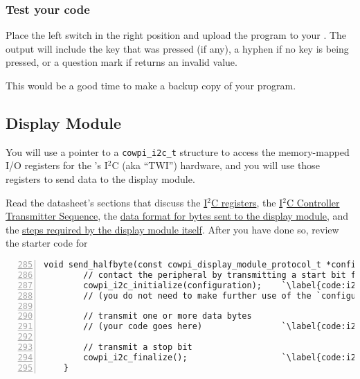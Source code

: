 \subsubsection*{Test your code}

Place the left switch in the right position and upload the program to your \developmentboard.
The output will include the key that was pressed (if any), a hyphen if no key is being pressed, or a question mark if  returns an invalid value.

\vspace{1cm}

This would be a good time to make a backup copy of your program.


\subsection{Display Module} \label{subsec:DisplayModule}

You will use a pointer to a \lstinline{cowpi_i2c_t} structure to access the memory-mapped I/O registers for the \developmentboard's I$^2$C (aka ``TWI'') hardware,
and you will use those registers to send data to the display module.

Read the datasheet's sections that discuss
the \href{https://cow-pi.readthedocs.io/en/latest/microcontroller.html#atmega328ptwistruct}{I$^2$C registers},
the \href{https://cow-pi.readthedocs.io/en/latest/microcontroller.html#controller-transmitter-sequence}{I$^2$C Controller Transmitter Sequence},
the \href{https://cow-pi.readthedocs.io/en/latest/hardware/outputs.html#data-byte-for-lcd1602-display-module}{data format for bytes sent to the display module},
and the \href{https://cow-pi.readthedocs.io/en/latest/hardware/outputs.html#hd44780-driven-lcd-character-display}{steps required by the display module itself}.
After you have done so, review the starter code for

\begin{lstlisting}[numberstyle=\color{gray}, numbers=left, firstnumber=285, basicstyle=\ttfamily\small, escapechar=`]
    void send_halfbyte(const cowpi_display_module_protocol_t *configuration, uint8_t halfbyte, bool is_command) {
        // contact the peripheral by transmitting a start bit followed by the desired peripheral's address
        cowpi_i2c_initialize(configuration);    `\label{code:i2cInitialize}`
        // (you do not need to make further use of the `configuration` argument)

        // transmit one or more data bytes
        // (your code goes here)                `\label{code:i2cData}`

        // transmit a stop bit
        cowpi_i2c_finalize();                   `\label{code:i2cFinalize}`
    }
\end{lstlisting}

